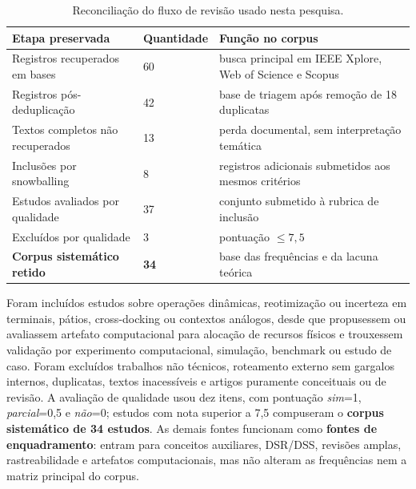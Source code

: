 \documentclass[
  12pt,
  oneside,
  a4paper,
  sumario=tradicional,
  brazil
]{abntex2}
\begin{document}
\begin{table}[H]
\centering
\small
\setlength{\tabcolsep}{6pt}
\renewcommand{\arraystretch}{1.18}
\begin{tabularx}{\textwidth}{@{}P{0.38\textwidth}C{0.14\textwidth}Y@{}}
\toprule
{}
\textbf{Etapa preservada} & \textbf{Quantidade} & \textbf{Fun\c{c}\~ao no corpus} \\
\midrule
Registros recuperados em bases & 60 & busca principal em IEEE Xplore, Web of Science e Scopus \\
\addlinespace
Registros p\'os-deduplica\c{c}\~ao & 42 & base de triagem ap\'os remo\c{c}\~ao de 18 duplicatas \\
\addlinespace
Textos completos n\~ao recuperados & 13 & perda documental, sem interpreta\c{c}\~ao tem\'atica \\
\addlinespace
Inclus\~oes por snowballing & 8 & registros adicionais submetidos aos mesmos crit\'erios \\
\addlinespace
Estudos avaliados por qualidade & 37 & conjunto submetido \`a rubrica de inclus\~ao \\
\addlinespace
Exclu\'idos por qualidade & 3 & pontua\c{c}\~ao $\leq 7{,}5$ \\
\addlinespace
\textbf{Corpus sistem\'atico retido} & \textbf{34} & base das frequ\^encias e da lacuna te\'orica \\
\bottomrule
\end{tabularx}
\caption[Fluxo de revis\~ao sistematizada]{Reconcilia\c{c}\~ao do fluxo de revis\~ao usado nesta pesquisa.}
\label{tab:fluxo-revisao-reconciliado}
\end{table}

Foram inclu\'idos estudos sobre opera\c{c}\~oes din\^amicas, reotimiza\c{c}\~ao ou incerteza em terminais, p\'atios, cross-docking ou contextos an\'alogos, desde que propusessem ou avaliassem artefato computacional para aloca\c{c}\~ao de recursos f\'isicos e trouxessem valida\c{c}\~ao por experimento computacional, simula\c{c}\~ao, benchmark ou estudo de caso. Foram exclu\'idos trabalhos n\~ao t\'ecnicos, roteamento externo sem gargalos internos, duplicatas, textos inacess\'iveis e artigos puramente conceituais ou de revis\~ao. A avalia\c{c}\~ao de qualidade usou dez itens, com pontua\c{c}\~ao \textit{sim}=1, \textit{parcial}=0,5 e \textit{n\~ao}=0; estudos com nota superior a 7,5 compuseram o \textbf{corpus sistem\'atico de 34 estudos}. As demais fontes funcionam como \textbf{fontes de enquadramento}: entram para conceitos auxiliares, DSR/DSS, revis\~oes amplas, rastreabilidade e artefatos computacionais, mas n\~ao alteram as frequ\^encias nem a matriz principal do corpus.
\end{document}
